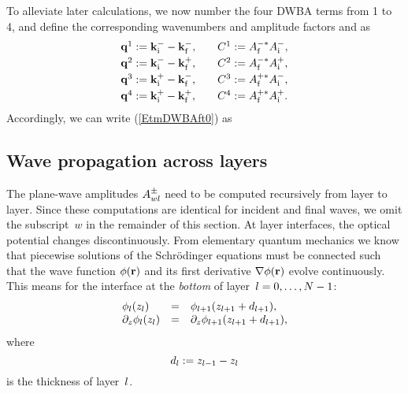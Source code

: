To alleviate later calculations,
we now number the four DWBA terms from 1 to 4,
and define the corresponding wavenumbers and amplitude factors and as
\begin{equation}
  \begin{array}{l@{\hspace{2em}}l}
    \q^1 := \k^-_\ti - \k^-_\tf,& C^1 := A^{-*}_\tf A^-_\ti, \\[.6ex]
    \q^2 := \k^-_\ti - \k^+_\tf,& C^2 := A^{-*}_\tf A^+_\ti, \\[.6ex]
    \q^3 := \k^+_\ti - \k^-_\tf,& C^3 := A^{+*}_\tf A^-_\ti, \\[.6ex]
    \q^4 := \k^+_\ti - \k^+_\tf,& C^4 := A^{+*}_\tf A^+_\ti.
  \end{array}
\end{equation}
Accordingly, we can write (\ref{EtmDWBAft0}) as

\subsection{Wave propagation across layers}\label{Sacrolay}

%
%
%

The plane-wave amplitudes $A^\pm_{wl}$ need to be computed recursively
from layer to layer.
Since these computations are identical for incident and final waves,
we omit the subscript~$w$ in the remainder of this section.
At layer interfaces, the optical potential changes discontinuously.
From elementary quantum mechanics we know that
piecewise solutions of the Schrödinger equations must be connected
such that the wave function $\phi(\mathbf{r})$ and its first derivative
$\mathbf{\nabla}\phi(\mathbf{r})$ evolve continuously.
This means for the interface
at the \textit{bottom} of layer~$l=0,\ldots,N-1$:%
\begin{equation}\label{Econtcond}
  \begin{array}{lcl}
            \phi_l(z_l)&=&\phi_{l+1}(z_{l+1}+d_{l+1}),\\
            \partial_z\phi_l(z_l)&=&\partial_z\phi_{l+1}(z_{l+1}+d_{l+1}),
  \end{array}
\end{equation}
  where
\begin{equation}
  d_l:=z_{l-1}-z_{l}
\end{equation}
is the thickness of layer~$l$.

